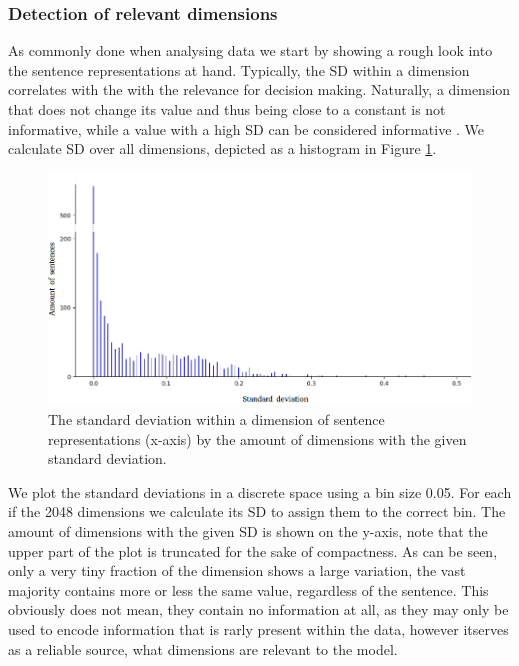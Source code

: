\subsubsection{Detection of relevant dimensions}
As commonly done when analysing data we start by showing a rough look into the sentence representations at hand. Typically, the \ac{SD} within a dimension correlates with the with the relevance for decision making. Naturally, a dimension that does not change its value and thus being close to a constant is not informative, while a value with a high \ac{SD} can be considered informative \citep{Bishop2007}. We calculate \ac{SD} over all dimensions, depicted as a histogram in Figure \ref{fig:sd}.
\begin{figure}[tph!]
\centering
	\includegraphics[totalheight=8cm]{fig/sd.png}
	\caption{The standard deviation within a dimension of sentence representations (x-axis) by the amount of dimensions with the given standard deviation.}
	\label{fig:sd}
\end{figure}
We plot the standard deviations in a discrete space using a bin size 0.05. For each if the 2048 dimensions we calculate its \ac{SD} to assign them to the correct bin. The amount of dimensions with the given \ac{SD} is shown on the y-axis, note that the upper part of the plot is truncated for the sake of compactness. As can be seen, only a very tiny fraction of the dimension shows a large variation, the vast majority contains more or less the same value, regardless of the sentence. This obviously  does not mean, they contain no information at all, as they may only be used to encode information that is rarly present within the data, however itserves as a reliable source, what dimensions are relevant to the model.


